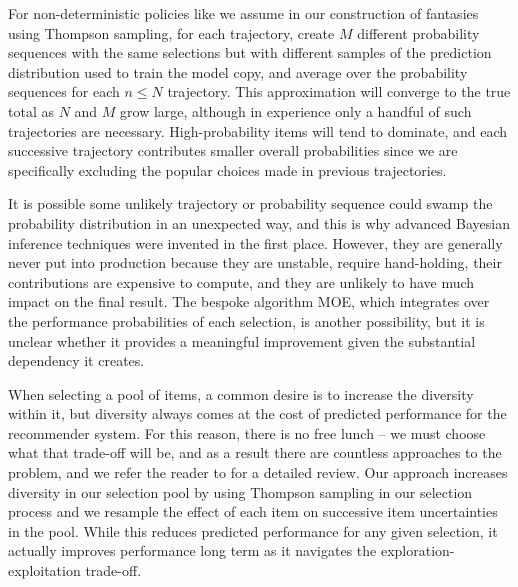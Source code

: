 \documentclass[manuscript, nonacm, screen=true]{acmart}
\begin{document}
For non-deterministic policies like we assume in our construction of fantasies using Thompson sampling, for each trajectory, create $M$ different probability sequences with the same selections but with different samples of the prediction distribution used to train the model copy, and average over the probability sequences for each $n\leq N$ trajectory. This approximation will converge to the true total as $N$ and $M$ grow large, although in experience only a handful of such trajectories are necessary. High-probability items will tend to dominate, and each successive trajectory contributes smaller overall probabilities since we are specifically excluding the popular choices made in previous trajectories.

It is possible some unlikely trajectory or probability sequence could swamp the probability distribution in an unexpected way, and this is why advanced Bayesian inference techniques were invented in the first place. However, they are generally never put into production because they are unstable, require hand-holding, their contributions are expensive to compute, and they are unlikely to have much impact on the final result. The bespoke algorithm MOE, which integrates over the performance probabilities of each selection\cite{scott_clark}, is another possibility, but it is unclear whether it provides a meaningful improvement given the substantial dependency it creates.

When selecting a pool of items, a common desire is to increase the diversity within it, but diversity always comes at the cost of predicted performance for the recommender system. For this reason, there is no free lunch -- we must choose what that trade-off will be, and as a result there are countless approaches to the problem, and we refer the reader to \cite{recsys_diversity_survey, netflix_recommender_system} for a detailed review.  
Our approach increases diversity in our selection pool by using Thompson sampling in our selection process and we resample the effect of each item on successive item uncertainties in the pool. While this reduces predicted performance for any given selection, it actually improves performance long term as it navigates the exploration-exploitation trade-off.
\end{document}
